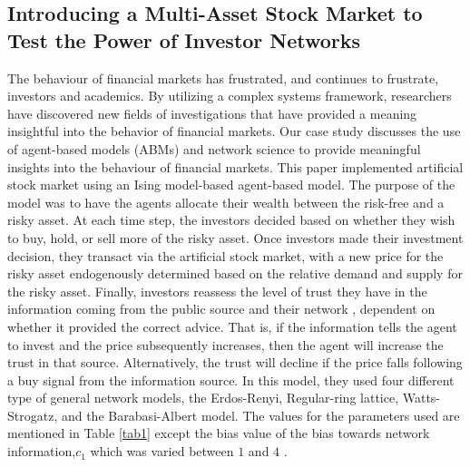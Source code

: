 \documentclass[runningheads]{llncs}
\begin{document}
\subsection{Introducing a Multi-Asset Stock Market to Test the Power of Investor Networks}
The behaviour of financial markets has frustrated, and continues to frustrate, investors and academics.
By utilizing a complex systems framework, researchers have discovered new fields of investigations that have provided a meaning insightful into the behavior of financial markets. Our case study \cite{ref_lncs3} discusses the use of agent-based models (ABMs) and network science to provide meaningful insights into the behaviour of financial markets.  This paper implemented artificial stock market using an Ising model-based agent-based model. The purpose of the model was to have the agents allocate their wealth between the risk-free and a risky asset. At each time step, the investors decided based on whether they wish to buy, hold, or sell more of the risky asset. Once investors made their investment decision, they transact via the artificial stock market, with a new price for the risky asset endogenously determined based on the relative demand and supply for the risky asset. Finally, investors reassess the level of trust they have in the information coming from the public source  and their network , dependent on whether it provided the correct advice. That is, if the information tells the agent to invest and the price subsequently increases, then the agent will increase the trust in that source. Alternatively, the trust will decline if the price falls following a buy signal from the information source. In this model, they used four different type of general network models, the Erdos-Renyi, Regular-ring lattice, Watts-Strogatz, and the Barabasi-Albert model. The values for the parameters used are mentioned in Table \ref{tab1} except the bias value of the bias towards network information,$c_1$ which was varied between $1$ and $4$ . 
\end{document}
